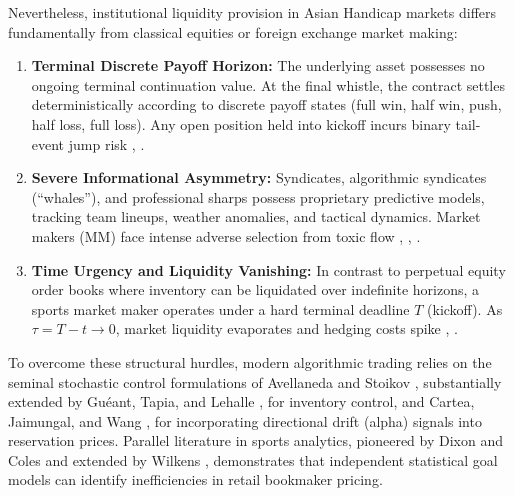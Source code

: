 \documentclass[10pt,twocolumn]{article}
\begin{document}
Nevertheless, institutional liquidity provision in Asian Handicap markets differs fundamentally from classical equities or foreign exchange market making:
\begin{enumerate}
    \item \textbf{Terminal Discrete Payoff Horizon:} The underlying asset possesses no ongoing terminal continuation value. At the final whistle, the contract settles deterministically according to discrete payoff states (full win, half win, push, half loss, full loss). Any open position held into kickoff incurs binary tail-event jump risk \cite{6}, \cite{10}.
    \item \textbf{Severe Informational Asymmetry:} Syndicates, algorithmic syndicates (``whales''), and professional sharps possess proprietary predictive models, tracking team lineups, weather anomalies, and tactical dynamics. Market makers (MM) face intense adverse selection from toxic flow \cite{5}, \cite{10}, \cite{14}.
    \item \textbf{Time Urgency and Liquidity Vanishing:} In contrast to perpetual equity order books where inventory can be liquidated over indefinite horizons, a sports market maker operates under a hard terminal deadline $T$ (kickoff). As $\tau = T - t \to 0$, market liquidity evaporates and hedging costs spike \cite{2}, \cite{3}.
\end{enumerate}

To overcome these structural hurdles, modern algorithmic trading relies on the seminal stochastic control formulations of Avellaneda and Stoikov \cite{4}, substantially extended by Guéant, Tapia, and Lehalle \cite{2}, \cite{15} for inventory control, and Cartea, Jaimungal, and Wang \cite{1}, \cite{3} for incorporating directional drift (alpha) signals into reservation prices. Parallel literature in sports analytics, pioneered by Dixon and Coles \cite{12} and extended by Wilkens \cite{11}, demonstrates that independent statistical goal models can identify inefficiencies in retail bookmaker pricing.
\end{document}
